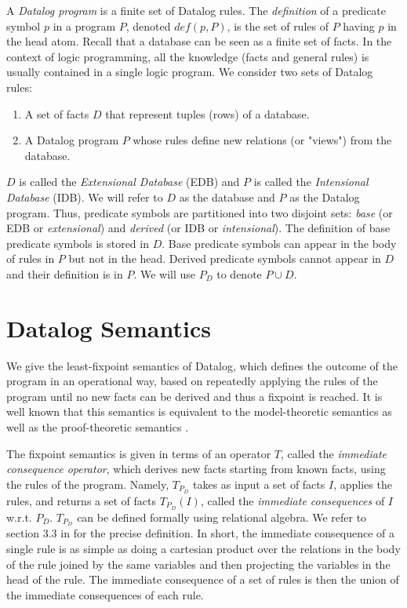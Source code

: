 \documentclass[11pt]{report}
\theoremstyle{definition}
\begin{document}
A \textit{Datalog program} is a finite set of Datalog rules. The \textit{definition} of a predicate symbol $p$ in a program $P$, denoted $def(p, P)$, is the set of rules of $P$ having $p$ in the head atom. Recall that a database can be seen as a finite set of facts. In the context of logic programming, all the knowledge (facts and general rules) is usually contained in a single logic program. We consider two sets of Datalog rules:
\begin{enumerate}
  \item A set of facts $D$ that represent tuples (rows) of a database.
  \item A Datalog program $P$ whose rules define new relations (or "views") from the database.
\end{enumerate}
$D$ is called the \textit{Extensional Database} (EDB) and $P$ is called the \textit{Intensional Database} (IDB). We will refer to $D$ as the database and $P$ as the Datalog program. Thus, predicate symbols are partitioned into two disjoint sets: \textit{base} (or EDB or \textit{extensional}) and \textit{derived} (or IDB or \textit{intensional}). The definition of base predicate symbols is stored in $D$. Base predicate symbols can appear in the body of rules in $P$ but not in the head. Derived predicate symbols cannot appear in $D$ and their definition is in $P$. We will use $P_D$ to denote $P \cup D$.

\section{Datalog Semantics}

We give the least-fixpoint semantics of Datalog, which defines the outcome of the program in an operational way, based on repeatedly applying the rules of the program until no new facts can be derived and thus a fixpoint is reached. It is well known that this semantics is equivalent to the model-theoretic semantics as well as the proof-theoretic semantics \cite{10.5555/551350}.

The fixpoint semantics is given in terms of an operator $T$, called the \textit{immediate consequence operator}, which derives new facts starting from known facts, using the rules of the program. Namely, $T_{P_D}$ takes as input a set of facts $I$, applies the rules, and returns a set of facts $T_{P_D}(I)$, called the \textit{immediate consequences} of $I$ w.r.t. $P_D$. $T_{P_D}$ can be defined formally using relational algebra. We refer to section 3.3 in \cite{greco_datalog_2016} for the precise definition. In short, the immediate consequence of a single rule is as simple as doing a cartesian product over the relations in the body of the rule joined by the same variables and then projecting the variables in the head of the rule. The immediate consequence of a set of rules is then the union of the immediate consequences of each rule.
\end{document}

